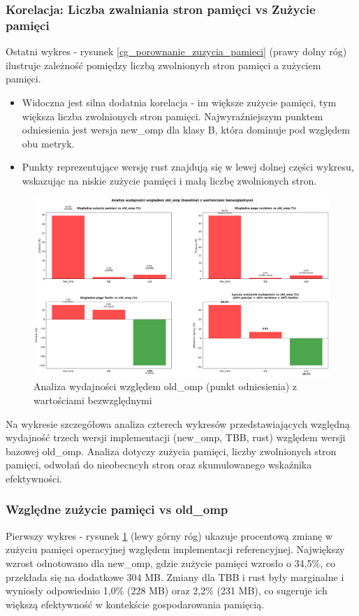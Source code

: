 \subsubsection{Korelacja: Liczba zwalniania stron pamięci vs Zużycie pamięci}
Ostatni wykres - rysunek \ref{cg_porownanie_zuzycia_pamieci} (prawy dolny róg) ilustruje zależność pomiędzy liczbą zwolnionych stron pamięci a zużyciem pamięci.
\begin{itemize}
    \item Widoczna jest silna dodatnia korelacja - im większe zużycie pamięci, tym większa liczba zwolnionych stron pamięci. Najwyraźniejszym punktem odniesienia jest wersja new\_omp dla klasy B, która dominuje pod względem obu metryk.
    \item Punkty reprezentujące wersję rust znajdują się w lewej dolnej części wykresu, wskazując na niskie zużycie pamięci i małą liczbę zwolnionych stron.
\end{itemize}

\begin{figure}[H]
    \centering
    \includegraphics[width=\textwidth]{analiza/images/parallel/cg/chart_05_performance_ratios.png}
    \caption{Analiza wydajności względem old\_omp (punkt odniesienia) z wartościami bezwzględnymi}
    \label{cg_analiza_wzgledem_old_omp}
\end{figure}
Na wykresie szczegółowa analiza czterech wykresów przedstawiających względną wydajność trzech wersji implementacji (new\_omp, TBB, rust) względem wersji bazowej old\_omp. Analiza dotyczy zużycia pamięci, liczby zwolnionych stron pamięci, odwołań do nieobecncyh stron oraz skumulowanego wskaźnika efektywności.
\subsubsection{Względne zużycie pamięci vs old\_omp}
Pierwszy wykres - rysunek \ref{cg_analiza_wzgledem_old_omp} (lewy górny róg) ukazuje procentową zmianę w zużyciu pamięci operacyjnej względem implementacji referencyjnej. Największy wzrost odnotowano dla new\_omp, gdzie zużycie pamięci wzrosło o 34,5\%, co przekłada się na dodatkowe 304 MB. Zmiany dla TBB i rust były marginalne i wyniosły odpowiednio 1,0\% (228 MB) oraz 2,2\% (231 MB), co sugeruje ich większą efektywność w kontekście gospodarowania pamięcią.

